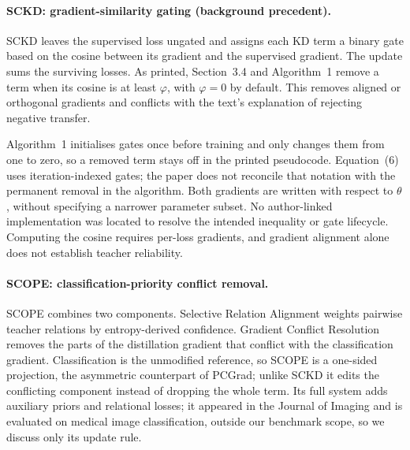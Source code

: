 \paragraph{SCKD: gradient-similarity gating (background precedent).}
SCKD \citep{zhu2021sckd} leaves the supervised loss ungated and assigns each KD term a binary gate
based on the cosine between its gradient and the supervised gradient. The update sums the surviving
losses. As printed, Section~3.4 and Algorithm~1 remove a term when its cosine is at least $\varphi$,
with $\varphi=0$ by default. This removes aligned or orthogonal gradients and conflicts with the text's
explanation of rejecting negative transfer.

Algorithm~1 initialises gates once before training and only changes them from one to zero, so a removed
term stays off in the printed pseudocode. Equation~(6) uses iteration-indexed gates; the paper does not
reconcile that notation with the permanent removal in the algorithm. Both gradients are written with
respect to $\theta$, without specifying a narrower parameter subset. No author-linked implementation
was located to resolve the intended inequality or gate lifecycle. Computing the cosine requires
per-loss gradients, and gradient alignment alone does not establish teacher reliability.


\paragraph{SCOPE: classification-priority conflict removal.}
SCOPE \citep{chen2026scope} combines two components. Selective Relation Alignment weights pairwise teacher relations by entropy-derived confidence.
Gradient Conflict Resolution removes the parts of the distillation gradient that conflict with
the classification gradient. Classification is the unmodified reference, so SCOPE is a one-sided projection, the asymmetric counterpart of PCGrad; unlike SCKD it edits the conflicting component instead of dropping
the whole term. Its full system adds auxiliary priors and relational losses; it appeared in the Journal of Imaging
and is evaluated on medical image classification, outside our benchmark scope, so we discuss only its update rule.

